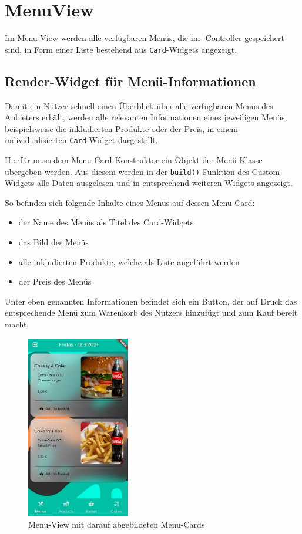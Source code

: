 \section{MenuView}
\label{menuview}

Im Menu-View werden alle verfügbaren Menüs, die im -Controller gespeichert
sind, in Form einer Liste bestehend aus \lstinline{Card}-Widgets angezeigt.

\subsection{Render-Widget für Menü-Informationen}

Damit ein Nutzer schnell einen Überblick über alle verfügbaren Menüs des Anbieters erhält,
werden alle relevanten Informationen eines jeweiligen Menüs, beispielsweise die inkludierten
Produkte oder der Preis, in einem individualisierten \lstinline{Card}-Widget dargestellt.

Hierfür muss dem Menu-Card-Konstruktor ein Objekt der Menü-Klasse übergeben werden. Aus diesem
werden in der \lstinline{build()}-Funktion des Custom-Widgets alle Daten ausgelesen und in 
entsprechend weiteren Widgets angezeigt.

So befinden sich folgende Inhalte eines Menüs auf dessen Menu-Card:

\begin{itemize}
    \item der Name des Menüs als Titel des Card-Widgets
    \item das Bild des Menüs
    \item alle inkludierten Produkte, welche als Liste angeführt werden
    \item der Preis des Menüs
\end{itemize}

Unter eben genannten Informationen befindet sich ein Button, der auf Druck das entsprechende Menü
zum Warenkorb des Nutzers hinzufügt und zum Kauf bereit macht.

\begin{figure}[H]
    \centering
    \includegraphics[width=0.40\textwidth]{images/Client/views/menuview/menuView.png}
    \caption{Menu-View mit darauf abgebildeten Menu-Cards}
\end{figure}


